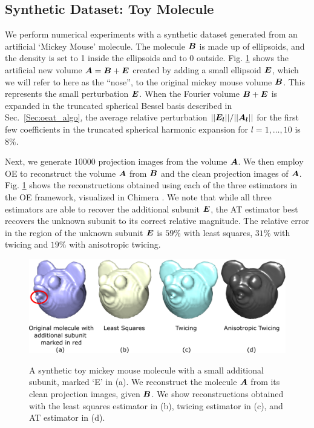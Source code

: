 \subsection{Synthetic Dataset: Toy Molecule}
We perform numerical experiments with a synthetic dataset generated from an 
artificial `Mickey Mouse' molecule. The molecule $\boldsymbol{B}$ is made up of 
ellipsoids, and the density is set to 1 inside the ellipsoids and to 0 outside. 
Fig. \ref{fig:mickey_recon} shows the artificial new volume $\boldsymbol{A} = \boldsymbol{B} + \boldsymbol{E}$ 
created by adding a small ellipsoid $\boldsymbol{E}$, which we will refer to here as the 
``nose'', to the original mickey mouse volume $\boldsymbol{B}$. This represents the small 
perturbation $\boldsymbol{E}$. When the Fourier volume $\boldsymbol{B} + \boldsymbol{E}$ is expanded in the 
truncated spherical Bessel basis described in Sec.~\ref{Sec:oeat_algo}, the 
average relative perturbation $||\boldsymbol{E}_{\boldsymbol{l}}||/||\boldsymbol{A}_{\boldsymbol{l}}||$ for the first few coefficients 
in the truncated spherical harmonic expansion for $l=1,\ldots,10$ is $8\%$.

Next, we generate $10000$ projection images from the volume $\boldsymbol{A}$. We then 
employ OE to reconstruct the volume $\boldsymbol{A}$ from $\boldsymbol{B}$ and the clean projection 
images of $\boldsymbol{A}$. Fig. \ref{fig:mickey_recon} shows the reconstructions obtained 
using each of the three estimators in the OE framework, visualized in Chimera \cite{chimera}. 
We note that while all three estimators are able to recover the additional 
subunit $\boldsymbol{E}$, the AT estimator best recovers the unknown subunit to its 
correct relative magnitude. The relative error in the region of the unknown 
subunit $\boldsymbol{E}$ is $59\%$ with least squares, $31\%$ with twicing and $19\%$ with 
anisotropic twicing.

\begin{figure}[]
\caption{A synthetic toy mickey mouse molecule with a small additional subunit, 
marked `E' in (a). We reconstruct the molecule $\boldsymbol{A}$ from its clean projection 
images, given $\boldsymbol{B}$. We show reconstructions obtained with the least squares 
estimator in (b), twicing estimator in (c), and AT estimator in (d). }
\includegraphics[width=0.95\linewidth]{figures/mickey.pdf}
\label{fig:mickey_recon}
\end{figure}


